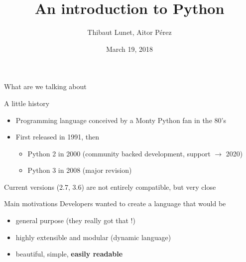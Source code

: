 \documentclass[11pt,unknownkeysallowed,usenames,dvipsnames]{beamer}
\title{An introduction to Python}
\author{Thibaut Lunet, Aitor Pérez}
\date{March 19, 2018}
\begin{document}
	\maketitle
    
	\begin{frame}{What are we talking about}
        \begin{block}{A little history}
            \begin{itemize}
            \item Programming language conceived by a Monty Python fan in the 80's
            \item First released in 1991, then
            \begin{itemize}
                \item Python 2 in 2000 (community backed development, support $\rightarrow$ 2020)
                \item Python 3 in 2008 (major revision)
            \end{itemize}
            \end{itemize}
            Current versions (2.7, 3.6) are not entirely compatible, 
            but very close
        \end{block}
        
        \begin{block}{Main motivations}
            Developers wanted to create a language that would be
            
            \vspace{-10pt}
            \begin{itemize}
                \item general purpose (they really got that !)
                \item highly extensible and modular (dynamic language)
                \item beautiful, simple, \textbf{easily readable}
               \end{itemize} 
        \end{block}
        
        \vspace*{-20pt}
	\end{frame}
    
\end{document}
